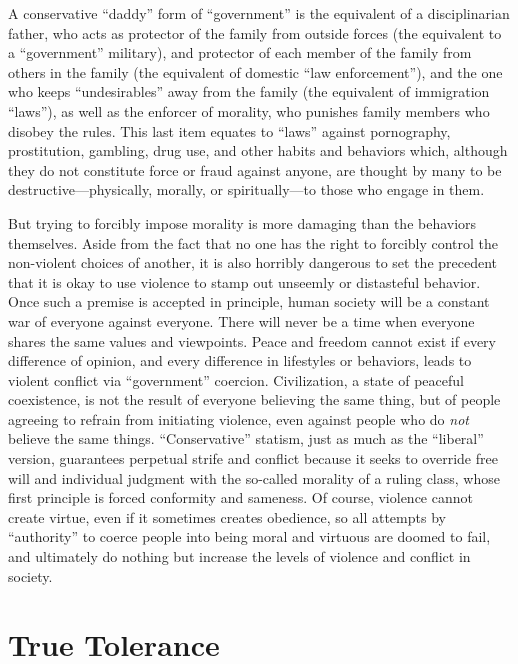 \documentclass{book}
\begin{document}
A conservative \enquote{daddy} form of \enquote{government} is the equivalent of a disciplinarian father, who acts as protector of the family from outside forces (the equivalent to a \enquote{government} military), and protector of each member of the family from others in the family (the equivalent of domestic \enquote{law enforcement}), and the one who keeps \enquote{undesirables} away from the family (the equivalent of immigration \enquote{laws}), as well as the enforcer of morality, who punishes family members who disobey the rules. This last item equates to \enquote{laws} against pornography, prostitution, gambling, drug use, and other habits and behaviors which, although they do not constitute force or fraud against anyone, are thought by many to be destructive---physically, morally, or spiritually---to those who engage in them.

But trying to forcibly impose morality is more damaging than the behaviors themselves. Aside from the fact that no one has the right to forcibly control the non-violent choices of another, it is also horribly dangerous to set the precedent that it is okay to use violence to stamp out unseemly or distasteful behavior. Once such a premise is accepted in principle, human society will be a constant war of everyone against everyone. There will never be a time when everyone shares the same values and viewpoints. Peace and freedom cannot exist if every difference of opinion, and every difference in lifestyles or behaviors, leads to violent conflict via \enquote{government} coercion. Civilization, a state of peaceful coexistence, is not the result of everyone believing the same thing, but of people agreeing to refrain from initiating violence, even against people who do \emph{not} believe the same things. \enquote{Conservative} statism, just as much as the \enquote{liberal} version, guarantees perpetual strife and conflict because it seeks to override free will and individual judgment with the so-called morality of a ruling class, whose first principle is forced conformity and sameness. Of course, violence cannot create virtue, even if it sometimes creates obedience, so all attempts by \enquote{authority} to coerce people into being moral and virtuous are doomed to fail, and ultimately do nothing but increase the levels of violence and conflict in society.

\section{True Tolerance}
\end{document}
